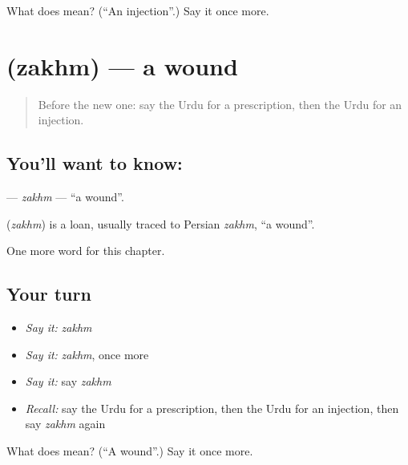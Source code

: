 \begin{tcolorbox}[breakable,colback=teal!4,colframe=teal!35!black,title={Before you move on}]
What does  mean? (\textquotedblleft{}An injection\textquotedblright{}.) Say it once more.
\end{tcolorbox}
\section[\texorpdfstring{\ur{زخم} (zakhm)}{زخم (zakhm)}]{ (zakhm) — a wound}

\label{lesson:UR-C185-zakhm}



\begin{quote}
Before the new one: say the Urdu for a prescription, then the Urdu for an injection.
\end{quote}

\subsection*{You'll want to know: }
\textbf{} — \emph{zakhm} — \textquotedblleft{}a wound\textquotedblright{}.

\begin{cousinweb}
\textbf{} (\emph{zakhm}) is a loan, usually traced to Persian \emph{zakhm}, \textquotedblleft{}a wound\textquotedblright{}.
\end{cousinweb}

\begin{grammarlens}[title={What you've built}]
One more word for this chapter.
\end{grammarlens}

\subsection*{Your turn}
\begin{itemize}
\raggedright
  \item \emph{Say it:} \emph{zakhm}
  \item \emph{Say it:} \emph{zakhm}, once more
  \item \emph{Say it:} say \emph{zakhm}
  \item \emph{Recall:} say the Urdu for a prescription, then the Urdu for an injection, then say \emph{zakhm} again
\end{itemize}

\begin{tcolorbox}[breakable,colback=teal!4,colframe=teal!35!black,title={Before you move on}]
What does  mean? (\textquotedblleft{}A wound\textquotedblright{}.) Say it once more.
\end{tcolorbox}
